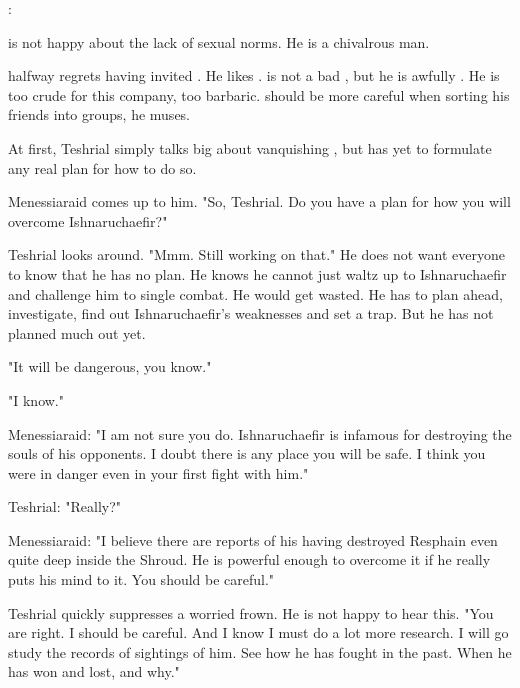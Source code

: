 \Dezruth:

\Teshrial is not happy about the \Mystraacht lack of sexual norms.
He is a chivalrous man. 

\Teshrial halfway regrets having invited \Dezruth.
He likes \Dezruth. 
\Dezruth is not a bad \resphan, but he is awfully \Mystraacht.
He is too crude for this company, too barbaric.
\Teshrial should be more careful when sorting his friends into groups, he muses.







\begin{comment}
\subsection{Menessiaraid}
\end{comment}
\new
At first, Teshrial simply talks big about vanquishing \Ishnaruchaefir, but has yet to formulate any real plan for how to do so. 

Menessiaraid comes up to him. 
"So, Teshrial. 
 Do you have a plan for how you will overcome Ishnaruchaefir?"

Teshrial looks around. 
"Mmm. Still working on that."
He does not want everyone to know that he has no plan. 
He knows he cannot just waltz up to Ishnaruchaefir and challenge him to single combat. 
He would get wasted.
He has to plan ahead, investigate, find out Ishnaruchaefir's weaknesses and set a trap. 
But he has not planned much out yet. 

"It will be dangerous, you know."

"I know."

Menessiaraid: 
"I am not sure you do. 
 Ishnaruchaefir is infamous for destroying the souls of his opponents.
 I doubt there is any place you will be safe.
 I think you were in danger even in your first fight with him."

Teshrial: 
"Really?"

Menessiaraid:
"I believe there are reports of his having destroyed Resphain even quite deep inside the Shroud.
 He is powerful enough to overcome it if he really puts his mind to it.
 You should be careful."

Teshrial quickly suppresses a worried frown.
He is not happy to hear this. 
"You are right. 
 I should be careful.
 And I know I must do a lot more research.
 I will go study the records of sightings of him.
 See how he has fought in the past.
 When he has won and lost, and why."

